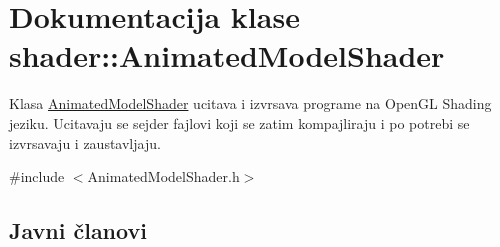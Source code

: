 \hypertarget{classshader_1_1AnimatedModelShader}{}\section{Dokumentacija klase shader\+:\+:Animated\+Model\+Shader}
\label{classshader_1_1AnimatedModelShader}


Klasa \hyperlink{classshader_1_1AnimatedModelShader}{Animated\+Model\+Shader} ucitava i izvrsava programe na Open\+GL Shading jeziku. Ucitavaju se sejder fajlovi koji se zatim kompajliraju i po potrebi se izvrsavaju i zaustavljaju.  




{\ttfamily \#include $<$Animated\+Model\+Shader.\+h$>$}

\subsection*{Javni članovi}
